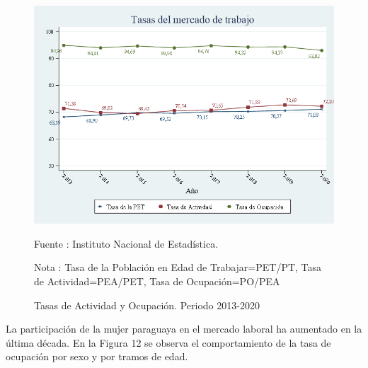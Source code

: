 \begin{figure}[H]
\begin{center}
                    \caption{Tasas de Actividad y Ocupación. Periodo 2013-2020}
                    \includegraphics[scale=0.55]{EPH_tasas_peaa.png}
                                    \item \footnotesize Fuente : Instituto Nacional de Estadística.
                                    \item \footnotesize Nota : Tasa de la Población en Edad de Trabajar=PET/PT, Tasa de Actividad=PEA/PET, Tasa de Ocupación=PO/PEA
                    \end{center}
\end{figure}

La participación de la mujer paraguaya en el mercado laboral ha
aumentado en la última década. En la Figura 12 se observa el
comportamiento de la tasa de ocupación por sexo y por tramos de edad.

